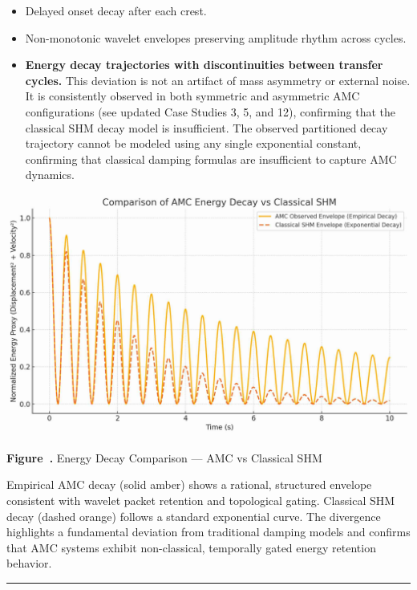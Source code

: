 \documentclass[10pt,aps,pre,onecolumn,superscriptaddress,notitlepage]{revtex4-2}
\renewcommand{\thefigure}{\arabic{figure}}
\begin{document}
\begin{itemize}
    \item Delayed onset decay after each crest.
    \item Non-monotonic wavelet envelopes preserving amplitude rhythm across cycles.
    \item \textbf{Energy decay trajectories with discontinuities between transfer cycles.} This deviation is not an artifact of mass asymmetry or external noise. It is consistently observed in both symmetric and asymmetric AMC configurations (see updated Case Studies 3, 5, and 12), confirming that the classical SHM decay model is insufficient. The observed partitioned decay trajectory cannot be modeled using any single exponential constant, confirming that classical damping formulas are insufficient to capture AMC dynamics.
\end{itemize}
\begin{center}
  \includegraphics[width=0.8\linewidth]{figures/Comparison Of AMC Energy Decay Vs Classical SHM 13A.jpg}

  \textbf{Figure~\thefigure.} Energy Decay Comparison — AMC vs Classical SHM  
  \smallskip

  \small
  Empirical AMC decay (solid amber) shows a rational, structured envelope consistent with wavelet packet retention and topological gating. Classical SHM decay (dashed orange) follows a standard exponential curve. The divergence highlights a fundamental deviation from traditional damping models and confirms that AMC systems exhibit non-classical, temporally gated energy retention behavior.
  \label{fig:EnergyDecayComparison}
\end{center}

\vspace{1em}
\hrule
\vspace{1em}

\end{document}
